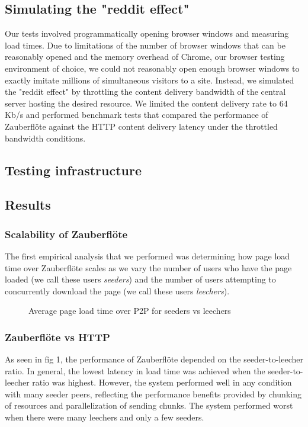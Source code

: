 \documentclass[letterpaper,twocolumn,10pt]{article}
\newcommand{\zbf}{Zauberfl\"{o}te\xspace}
\begin{document}
\subsection{Simulating the "reddit effect"}
Our tests involved programmatically opening browser windows and measuring load times.
Due to limitations of the number of browser windows that can be reasonably opened
and the memory overhead of Chrome, our browser testing environment of choice, we could
not reasonably open enough browser windows to exactly imitate millions of simultaneous
visitors to a site. Instead, we simulated the "reddit effect" by throttling the content delivery
bandwidth of the central server hosting the desired resource. We limited the content delivery
rate to 64 Kb/s and performed benchmark tests that compared the performance of \zbf
against the HTTP content delivery latency under the throttled bandwidth conditions.


\subsection{Testing infrastructure}


\subsection{Results}


\subsubsection{Scalability of \zbf}
The first empirical analysis that we performed was determining how page load time
over \zbf scales as we vary the number of users who have the page loaded (we call
these users \textit{seeders}) and the number of users attempting to concurrently
download the page (we call these users \textit{leechers}).

\begin{figure}[h]
\caption{Average page load time over P2P for seeders vs leechers}
\end{figure}

\subsubsection{\zbf vs HTTP}
As seen in fig 1, the performance of \zbf depended on the seeder-to-leecher ratio.
In general, the lowest latency in load time was achieved when the seeder-to-leecher
ratio was highest. However, the system performed well in any condition with many
seeder peers, reflecting the performance benefits provided by chunking of resources
and parallelization of sending chunks. The system performed worst when there were many
leechers and only a few seeders.
\end{document}
